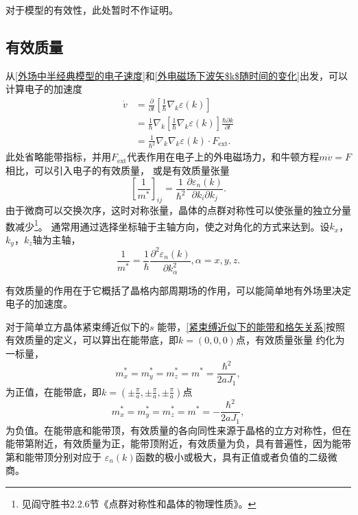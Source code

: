             对于模型的有效性，此处暂时不作证明。

        \subsection{有效质量}
            从\autoref{外场中半经典模型的电子速度}和\autoref{外电磁场下波矢$k$随时间的变化}出发，可以计算电子的加速度
            \begin{equation}
                \begin{split}
                    \dot{v}&=\frac{\partial}{\partial t}\left[ \frac{1}{\hbar}\nabla_k\varepsilon(k) \right]\\
                    &=\frac{1}{\hbar}\nabla_k\left[ \frac{1}{\hbar}\nabla_k\varepsilon(k) \right]\frac{\hbar\partial k}{\partial t}\\
                    &=\frac{1}{\hbar^2}\nabla_k\nabla_k\varepsilon(k)\cdot F_{\mathrm{ext}}.
                \end{split}\label{半经典模型中计算电子的加速度}
            \end{equation}
            此处省略能带指标，并用$F_{\mathrm{ext}}$代表作用在电子上的外电磁场力，和牛顿方程$m\dot{v}=F$相比，可以引入电子的有效质量，
            或是有效质量张量
            \begin{equation}
                \left[ \frac{1}{m^*} \right]_{ij}=\frac{1}{\hbar^2}\frac{\partial\varepsilon_n(k)}{\partial k_i\partial k_j}.
            \end{equation}
            由于微商可以交换次序，这时对称张量，晶体的点群对称性可以使张量的独立分量数减少\footnote{见阎守胜书2.2.6节《点群对称性和晶体的物理性质》。}。
            通常用通过选择坐标轴于主轴方向，使之对角化的方式来达到。设$k_x$，$k_y$，$k_z$轴为主轴，
            \begin{equation}
                \frac{1}{m^*}=\frac{1}{\hbar}\frac{\partial^2\varepsilon_n(k)}{\partial k^2_{\alpha}},\alpha=x,y,z\label{有效质量定义}.
            \end{equation}

            有效质量的作用在于它概括了晶格内部周期场的作用，可以能简单地有外场里决定电子的加速度。

            对于简单立方晶体紧束缚近似下的$s$ 能带，\autoref{紧束缚近似下的能带和格矢关系}按照有效质量的定义，可以算出在能带底，即$k=(0,0,0)$点，有效质量张量
            约化为一标量，
            \begin{equation}
                m_x^*=m_y^*=m_z^*=m^*=\frac{\hbar^2}{2aJ_1},
            \end{equation}
            为正值，在能带底，即$k=\left( \pm\frac{\pi}{a},\pm\frac{\pi}{a},\pm\frac{\pi}{a} \right)$点
            \begin{equation}
                m_x^*=m_y^*=m_z^*=m^*=-\frac{\hbar^2}{2aJ_1},
            \end{equation}
            为负值。在能带底和能带顶，有效质量的各向同性来源于晶格的立方对称性，但在能带第附近，有效质量为正，能带顶附近，有效质量为负，具有普遍性，因为能带第和能带顶分别对应于
            $\varepsilon_n(k)$函数的极小或极大，具有正值或者负值的二级微商。

